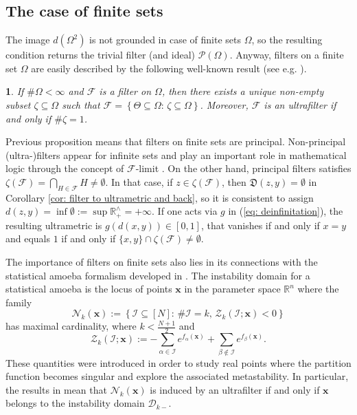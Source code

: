 \documentclass[11pt,british,reqno]{article}
\numberwithin{equation}{section}
\numberwithin{figure}{section}
\numberwithin{table}{section}
\theoremstyle{definition}
\theoremstyle{definition}
\theoremstyle{plain}
\theoremstyle{plain}
\newtheorem{proposition}{\protect\propositionname}
\theoremstyle{remark}
\theoremstyle{plain}
\numberwithin{equation}{section}
\numberwithin{figure}{section}
\numberwithin{table}{section}
\theoremstyle{plain}
\providecommand{\propositionname}{Proposition}
\begin{document}
\subsection{\label{subsec: The case of finite sets} The case of finite sets}

The image $d(\Omega^{2})$ is not grounded in case of finite sets
$\Omega$, so the resulting condition returns the trivial filter (and
ideal) $\mathcal{P}(\Omega)$. Anyway, filters on a finite set $\Omega$
are easily described by the following well-known result (see e.g. \cite{Mendelson2015}). 
\begin{proposition}
\label{prop: (ultra-)filters in finite case} If $\#\Omega<\infty$
and $\mathcal{F}$ is a filter on $\Omega$, then there exists a unique
non-empty subset $\zeta\subseteq\Omega$ such that ${\displaystyle \mathcal{F}=\left\{ \Theta\subseteq\Omega:\,\zeta\subseteq\Omega\right\} }$.
Moreover, $\mathcal{F}$ is an ultrafilter if and only if $\#\zeta=1$. 
\end{proposition}

Previous proposition means that filters on finite sets are principal. Non-principal
(ultra-)filters appear for infinite sets and play an important role in
mathematical logic through the concept of $\mathcal{F}$-limit \cite{Mendelson2015}.
On the other hand, principal filters satisfies ${\displaystyle \zeta(\mathcal{F})=\bigcap_{H\in\mathcal{F}}H\neq\emptyset}$.
In that case, if $z\in\zeta(\mathcal{F})$, then $\mathfrak{D}(z,y)=\emptyset$
in Corollary \ref{cor: filter to ultrametric and back}, so it is
consistent to assign $d(z,y)=\inf\emptyset:=\sup\mathbb{R}_{+}^{\wedge}=+\infty$.
If one acts via $g$ in (\ref{eq: deinfinitation}),
the resulting ultrametric is $g(d(x,y))\in[0,1]$, that vanishes if
and only if $x=y$ and equals $1$ if and only if $\{x,y\}\cap\zeta(\mathcal{F})\neq\emptyset$. 

The importance of filters on finite sets also lies in its
connections with the statistical amoeba formalism developed in \cite{AK2016b}.
The instability domain for a statistical amoeba is the locus of points
$\boldsymbol{x}$ in the parameter space $\mathbb{R}^n$ where the family 
\begin{equation}
\mathcal{N}_{k}(\boldsymbol{x}):=\left\{ \mathcal{I}\subseteq[N]:\,\#\mathcal{I}=k,\,\mathcal{Z}_{k}(\mathcal{I};\boldsymbol{x})<0\right\} \label{eq: family negative weighted set statistical amoeba}
\end{equation}
 has maximal cardinality, where ${\displaystyle k<\frac{N+1}{2}}$
and 
\begin{equation}
{\displaystyle \mathcal{Z}_{k}(\mathcal{I};\boldsymbol{x}):=-\sum_{\alpha\in\mathcal{I}}e^{f_{\alpha}(\boldsymbol{x})}+\sum_{\beta\notin\mathcal{I}}e^{f_{\beta}(\boldsymbol{x})}}.\label{eq: weight set statistical amoeba}
\end{equation}
These quantities were introduced in order to study real points where the partition function becomes singular and explore the associated metastability. 
In particular, the results in \cite{AK2016b} mean that $\mathcal{N}_{k}(\boldsymbol{x})$
is induced by an ultrafilter if and only if $\boldsymbol{x}$ belongs to the
instability domain $\mathcal{D}_{k-}$. 
\end{document}
